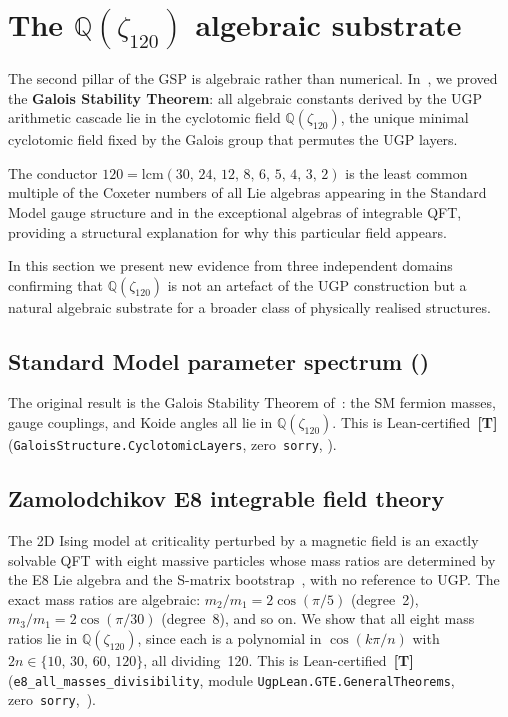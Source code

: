 \documentclass[11pt]{article}
\theoremstyle{remark}
\newcommand{\zetaN}[1]{\zeta_{#1}}
\newcommand{\lean}[1]{\texttt{#1}}
\begin{document}
\section{\texorpdfstring{The $\mathbb{Q}(\zeta_{120})$ algebraic substrate}{The Q(zeta 120) algebraic substrate}}
\label{sec:q120}

The second pillar of the GSP is algebraic rather than numerical.
In~\cite{Spivack2026_SM_UGP}, we proved the \textbf{Galois Stability Theorem}:
all algebraic constants derived by the UGP arithmetic cascade lie in the
cyclotomic field $\mathbb{Q}(\zetaN{120})$, the unique minimal cyclotomic field
fixed by the Galois group that permutes the UGP layers.

The conductor $120 = \mathrm{lcm}(30,\,24,\,12,\,8,\,6,\,5,\,4,\,3,\,2)$
is the least common multiple of the Coxeter numbers of all Lie algebras
appearing in the Standard Model gauge structure and in the exceptional algebras
of integrable QFT, providing a structural explanation for why this particular
field appears.

In this section we present new evidence from three independent domains confirming
that $\mathbb{Q}(\zetaN{120})$ is not an artefact of the UGP construction but a
natural algebraic substrate for a broader class of physically realised structures.

\subsection{\texorpdfstring{Standard Model parameter spectrum (\cite{Spivack2026_SM_UGP})}{Standard Model parameter spectrum}}

The original result is the Galois Stability Theorem of~\cite{Spivack2026_SM_UGP}:
the SM fermion masses, gauge couplings, and Koide angles all lie in
$\mathbb{Q}(\zetaN{120})$.
This is Lean-certified~\textbf{[T]}
(\lean{GaloisStructure.CyclotomicLayers}, zero~\lean{sorry},
\cite{ugp-lean}).

\subsection{Zamolodchikov E8 integrable field theory}

The 2D Ising model at criticality perturbed by a magnetic field is an exactly
solvable QFT with eight massive particles whose mass ratios are determined
by the E8 Lie algebra and the S-matrix bootstrap~\cite{Zamolodchikov1989},
with no reference to UGP.
The exact mass ratios are algebraic: $m_2/m_1 = 2\cos(\pi/5)$ (degree~2),
$m_3/m_1 = 2\cos(\pi/30)$ (degree~8), and so on.
We show that all eight mass ratios lie in $\mathbb{Q}(\zetaN{120})$, since
each is a polynomial in $\cos(k\pi/n)$ with $2n \in \{10,\,30,\,60,\,120\}$,
all dividing~120.
This is Lean-certified~\textbf{[T]} (\lean{e8\_all\_masses\_divisibility},
module \lean{UgpLean.GTE.GeneralTheorems}, zero~\lean{sorry},~\cite{ugp-lean}).
\end{document}
